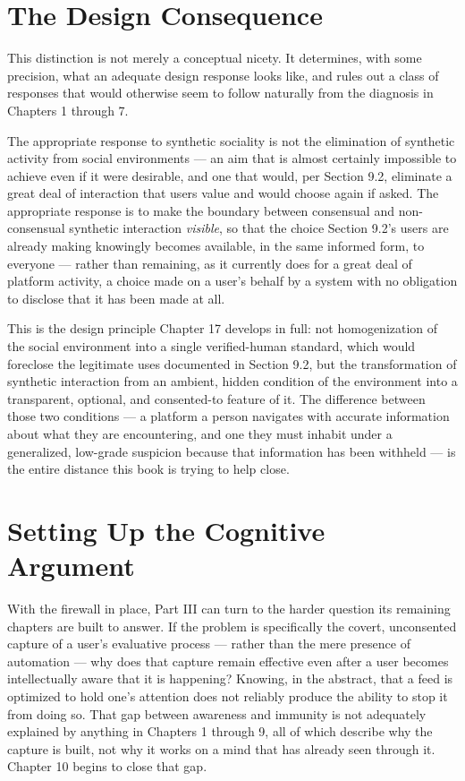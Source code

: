 \documentclass[12pt,a4paper]{book}
\begin{document}
\section{The Design Consequence}

This distinction is not merely a conceptual nicety. It determines, with some precision, what an adequate design response looks like, and rules out a class of responses that would otherwise seem to follow naturally from the diagnosis in Chapters 1 through 7.

The appropriate response to synthetic sociality is not the elimination of synthetic activity from social environments — an aim that is almost certainly impossible to achieve even if it were desirable, and one that would, per Section 9.2, eliminate a great deal of interaction that users value and would choose again if asked. The appropriate response is to make the boundary between consensual and non-consensual synthetic interaction \emph{visible}, so that the choice Section 9.2's users are already making knowingly becomes available, in the same informed form, to everyone — rather than remaining, as it currently does for a great deal of platform activity, a choice made on a user's behalf by a system with no obligation to disclose that it has been made at all.

This is the design principle Chapter 17 develops in full: not homogenization of the social environment into a single verified-human standard, which would foreclose the legitimate uses documented in Section 9.2, but the transformation of synthetic interaction from an ambient, hidden condition of the environment into a transparent, optional, and consented-to feature of it. The difference between those two conditions — a platform a person navigates with accurate information about what they are encountering, and one they must inhabit under a generalized, low-grade suspicion because that information has been withheld — is the entire distance this book is trying to help close.

\section{Setting Up the Cognitive Argument}

With the firewall in place, Part III can turn to the harder question its remaining chapters are built to answer. If the problem is specifically the covert, unconsented capture of a user's evaluative process — rather than the mere presence of automation — why does that capture remain effective even after a user becomes intellectually aware that it is happening? Knowing, in the abstract, that a feed is optimized to hold one's attention does not reliably produce the ability to stop it from doing so. That gap between awareness and immunity is not adequately explained by anything in Chapters 1 through 9, all of which describe why the capture is built, not why it works on a mind that has already seen through it. Chapter 10 begins to close that gap.
\end{document}
